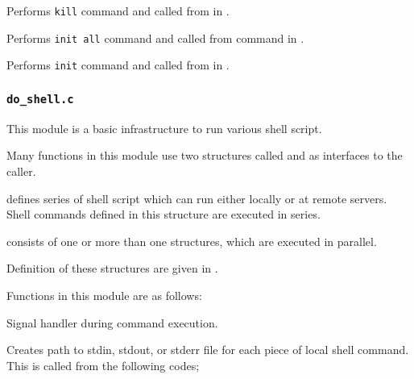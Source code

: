   
      Performs \texttt{kill} command and called from  in .
  
  
      Performs \texttt{init all} command and called from  command in .
  
  
      Performs \texttt{init} command and called from  in .



\subsubsection{\texttt{do\_shell.c}}

  This module is a basic infrastructure to run various shell script.
  
  Many functions in this module use two structures called  and  as interfaces
  to the caller.
  
   defines series of shell script which can run either locally or at remote servers.
  Shell commands defined in this structure are executed in series.
  
   consists of one or more than one  structures, which are executed in parallel.
  
  Definition of these structures are given in .
  
  Functions in this module are as follows:
  
  
      Signal handler during command execution.
  
  
      Creates path to stdin, stdout, or stderr file for each piece of local shell command.
      This is called from the following codes;
      
      \FuncRefHdr
		  \vspace{-10pt} \\ 
		  \vspace{-10pt} \\ 
		  \vspace{-10pt} \\
		  \\ \hline
      \FuncRefTrailor
  

